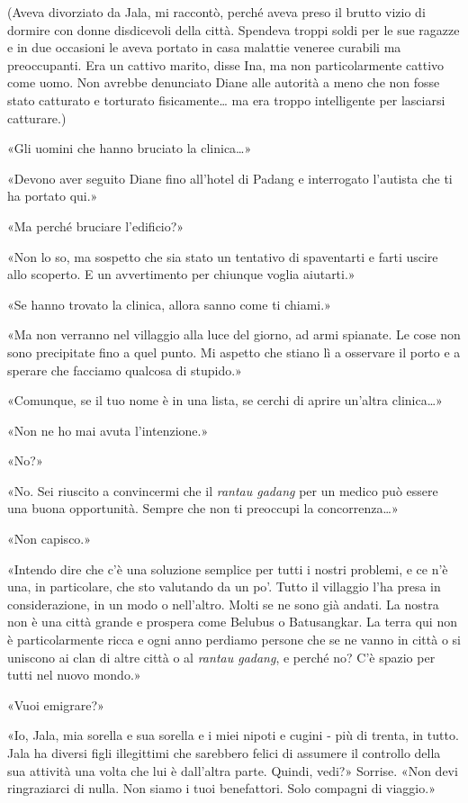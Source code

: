 (Aveva divorziato da Jala, mi raccontò, perché aveva preso il brutto
vizio di dormire con donne disdicevoli della città. Spendeva troppi
soldi per le sue ragazze e in due occasioni le aveva portato in casa
malattie veneree curabili ma preoccupanti. Era un cattivo marito, disse
Ina, ma non particolarmente cattivo come uomo. Non avrebbe denunciato
Diane alle autorità a meno che non fosse stato catturato e torturato
fisicamente\ldots{} ma era troppo intelligente per lasciarsi catturare.)

«Gli uomini che hanno bruciato la clinica\ldots»

«Devono aver seguito Diane fino all'hotel di Padang e interrogato
l'autista che ti ha portato qui.»

«Ma perché bruciare l'edificio?»

«Non lo so, ma sospetto che sia stato un tentativo di spaventarti e
farti uscire allo scoperto. E un avvertimento per chiunque voglia
aiutarti.»

«Se hanno trovato la clinica, allora sanno come ti chiami.»

«Ma non verranno nel villaggio alla luce del giorno, ad armi spianate.
Le cose non sono precipitate fino a quel punto. Mi aspetto che stiano lì
a osservare il porto e a sperare che facciamo qualcosa di stupido.»

«Comunque, se il tuo nome è in una lista, se cerchi di aprire un'altra
clinica\ldots»

«Non ne ho mai avuta l'intenzione.»

«No?»

«No. Sei riuscito a convincermi che il \emph{rantau gadang} per un
medico può essere una buona opportunità. Sempre che non ti preoccupi la
concorrenza\ldots»

«Non capisco.»

«Intendo dire che c'è una soluzione semplice per tutti i nostri
problemi, e ce n'è una, in particolare, che sto valutando da un po'.
Tutto il villaggio l'ha presa in considerazione, in un modo o
nell'altro. Molti se ne sono già andati. La nostra non è una città
grande e prospera come Belubus o Batusangkar. La terra qui non è
particolarmente ricca e ogni anno perdiamo persone che se ne vanno in
città o si uniscono ai clan di altre città o al \emph{rantau gadang}, e
perché no? C'è spazio per tutti nel nuovo mondo.»

«Vuoi emigrare?»

«Io, Jala, mia sorella e sua sorella e i miei nipoti e cugini - più di
trenta, in tutto. Jala ha diversi figli illegittimi che sarebbero felici
di assumere il controllo della sua attività una volta che lui è
dall'altra parte. Quindi, vedi?» Sorrise. «Non devi ringraziarci di
nulla. Non siamo i tuoi benefattori. Solo compagni di viaggio.»

